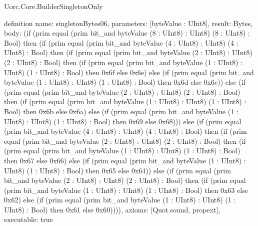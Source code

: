 \begin{lexlean}{Uorc.Core.BuilderSingletonOnly}
\begin{semanticmodule}
definition{
  name: singletonBytes06,
  parameters: [byteValue : UInt8],
  result: Bytes,
  body: (if (prim equal (prim bit_and byteValue (8 : UInt8) : UInt8) (8 : UInt8) : Bool) then (if (prim equal (prim bit_and byteValue (4 : UInt8) : UInt8) (4 : UInt8) : Bool) then (if (prim equal (prim bit_and byteValue (2 : UInt8) : UInt8) (2 : UInt8) : Bool) then (if (prim equal (prim bit_and byteValue (1 : UInt8) : UInt8) (1 : UInt8) : Bool) then 0x6f else 0x6e) else (if (prim equal (prim bit_and byteValue (1 : UInt8) : UInt8) (1 : UInt8) : Bool) then 0x6d else 0x6c)) else (if (prim equal (prim bit_and byteValue (2 : UInt8) : UInt8) (2 : UInt8) : Bool) then (if (prim equal (prim bit_and byteValue (1 : UInt8) : UInt8) (1 : UInt8) : Bool) then 0x6b else 0x6a) else (if (prim equal (prim bit_and byteValue (1 : UInt8) : UInt8) (1 : UInt8) : Bool) then 0x69 else 0x68))) else (if (prim equal (prim bit_and byteValue (4 : UInt8) : UInt8) (4 : UInt8) : Bool) then (if (prim equal (prim bit_and byteValue (2 : UInt8) : UInt8) (2 : UInt8) : Bool) then (if (prim equal (prim bit_and byteValue (1 : UInt8) : UInt8) (1 : UInt8) : Bool) then 0x67 else 0x66) else (if (prim equal (prim bit_and byteValue (1 : UInt8) : UInt8) (1 : UInt8) : Bool) then 0x65 else 0x64)) else (if (prim equal (prim bit_and byteValue (2 : UInt8) : UInt8) (2 : UInt8) : Bool) then (if (prim equal (prim bit_and byteValue (1 : UInt8) : UInt8) (1 : UInt8) : Bool) then 0x63 else 0x62) else (if (prim equal (prim bit_and byteValue (1 : UInt8) : UInt8) (1 : UInt8) : Bool) then 0x61 else 0x60)))),
  axioms: [Quot.sound, propext],
  executable: true
}


\end{semanticmodule}
\end{lexlean}

